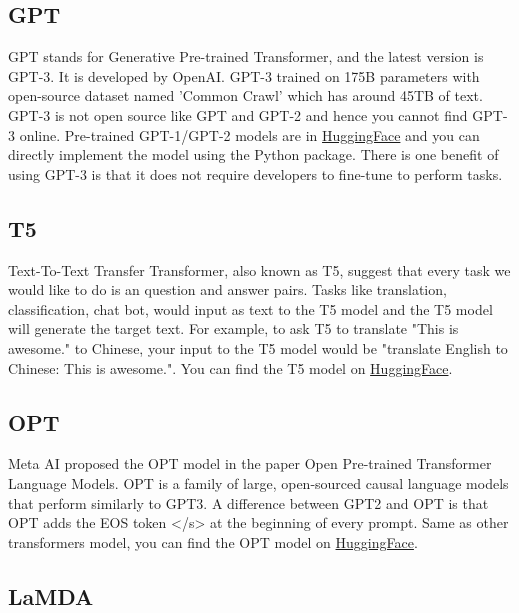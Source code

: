 \documentclass[a4paper, 11pt]{article}
\begin{document}
\subsection{GPT}

GPT stands for Generative Pre-trained Transformer, and the latest version is GPT-3\cite{DBLP:journals/corr/abs-2005-14165}. It is developed by OpenAI. GPT-3 trained on 175B parameters with open-source dataset named 'Common Crawl' which has around 45TB of text. GPT-3 is not open source like GPT\cite{radford2018improving} and GPT-2\cite{radford2019language} and hence you cannot find GPT-3 online. Pre-trained GPT-1/GPT-2 models are in \href{https://huggingface.co/docs/transformers/model_doc/gpt2}{HuggingFace} and you can directly implement the model using the Python package. There is one benefit of using GPT-3 is that it does not require developers to fine-tune to perform tasks. 

\subsection{T5}

Text-To-Text Transfer Transformer\cite{2020t5}, also known as  T5, suggest that every task we would like to do is an question and answer pairs. Tasks like translation, classification, chat bot, would input as text to the T5 model and the T5 model will generate the target text. For example, to ask T5 to translate "This is awesome." to Chinese, your input to the T5 model would be "translate English to Chinese: This is awesome.". You can find the T5 model on \href{https://huggingface.co/docs/transformers/model_doc/t5}{HuggingFace}.


\subsection{OPT}

Meta AI proposed the OPT model in the paper Open Pre-trained Transformer Language Models\cite{OPT}. OPT is a family of large, open-sourced causal language models that perform similarly to GPT3. A difference between GPT2 and OPT is that OPT adds the EOS token </s> at the beginning of every prompt. Same as other transformers model, you can find the OPT model on \href{https://huggingface.co/docs/transformers/model_doc/opt}{HuggingFace}.

\subsection{LaMDA}
\end{document}
